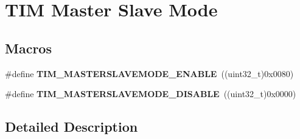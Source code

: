 \hypertarget{group___t_i_m___master___slave___mode}{}\section{T\+IM Master Slave Mode}
\label{group___t_i_m___master___slave___mode}
\subsection*{Macros}
\begin{DoxyCompactItemize}
\item 
\#define {\bfseries T\+I\+M\+\_\+\+M\+A\+S\+T\+E\+R\+S\+L\+A\+V\+E\+M\+O\+D\+E\+\_\+\+E\+N\+A\+B\+LE}~((uint32\+\_\+t)0x0080)\hypertarget{group___t_i_m___master___slave___mode_gafdc0de07db4688aa8c87cf03220aaf28}{}\label{group___t_i_m___master___slave___mode_gafdc0de07db4688aa8c87cf03220aaf28}

\item 
\#define {\bfseries T\+I\+M\+\_\+\+M\+A\+S\+T\+E\+R\+S\+L\+A\+V\+E\+M\+O\+D\+E\+\_\+\+D\+I\+S\+A\+B\+LE}~((uint32\+\_\+t)0x0000)\hypertarget{group___t_i_m___master___slave___mode_ga58ff99ef1d6d6f187e3615f9d3ec3b8b}{}\label{group___t_i_m___master___slave___mode_ga58ff99ef1d6d6f187e3615f9d3ec3b8b}

\end{DoxyCompactItemize}


\subsection{Detailed Description}
